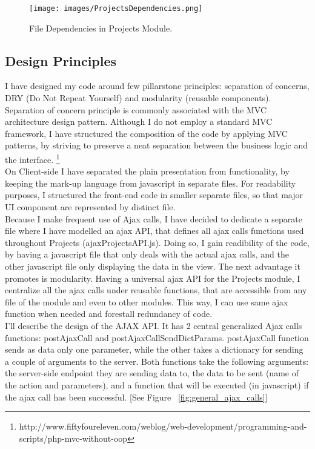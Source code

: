 \begin{figure}
\texttt{[image: images/ProjectsDependencies.png]}
\caption{File Dependencies in Projects Module.}
\label{fig:file_dependencies_projects}
\end{figure}

\subsection{Design Principles}

I have designed my code around few pillarstone principles: separation of concerns, DRY (Do Not Repeat Yourself) and modularity (reusable components). Separation of concern principle is commonly associated with the MVC architecture design pattern. Although I do not employ a standard MVC framework, I have structured the composition of the code by applying MVC patterns, by striving to preserve a neat separation between the business logic and the interface. \footnote{http://www.fiftyfoureleven.com/weblog/web-development/programming-and-scripts/php-mvc-without-oop}\\ 

On Client-side I have separated the plain presentation from functionality, by keeping the mark-up language from javascript in separate files. For readability purposes, I structured the front-end code in smaller separate files, so that major UI component are represented by distinct file.\\ 

Because I make frequent use of Ajax calls, I have decided to dedicate a separate file where I have modelled an ajax API, that defines all ajax calls functions used throughout Projects (ajaxProjectsAPI.js). Doing so, I gain readibility of the code, by having a javascript file that only deals with the actual ajax calls, and the other javascript file only displaying the data in the view. The next advantage it promotes is modularity. Having a universal ajax API for the Projects module, I centralize all the ajax calls under reusable functions, that are accessible from any file of the module and even to other modules. This way, I can use same ajax function when needed and forestall redundancy of code. \\ 

I'll describe the design of the AJAX API. It has 2 central generalized Ajax calls functions: postAjaxCall and postAjaxCallSendDictParams. postAjaxCall function sends as data only one parameter, while the other takes a dictionary for sending a couple of arguments to the server.
Both functions take the following arguments: the server-side endpoint they are sending data to, the data to be sent (name of the action and parameters), and a function that will be executed (in javascript) if the ajax call has been successful. [See Figure ~\ref{fig:general_ajax_calls}]\\ 

